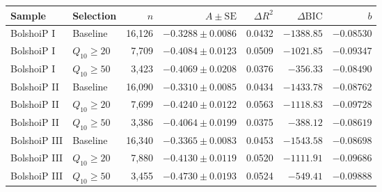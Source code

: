 \begin{tabular}{llrrrrr}
\toprule
Sample & Selection & $n$ & $A\pm\mathrm{SE}$ & $\Delta R^2$ & $\Delta\mathrm{BIC}$ & $b$ \\
\midrule
BolshoiP I & Baseline & 16,126 & $-0.3288\pm0.0086$ & 0.0432 & $-1388.85$ & $-0.08530$ \\
BolshoiP I & $Q_{10}\geq20$ & 7,709 & $-0.4084\pm0.0123$ & 0.0509 & $-1021.85$ & $-0.09347$ \\
BolshoiP I & $Q_{10}\geq50$ & 3,423 & $-0.4069\pm0.0208$ & 0.0376 & $-356.33$ & $-0.08490$ \\
BolshoiP II & Baseline & 16,090 & $-0.3310\pm0.0085$ & 0.0434 & $-1433.78$ & $-0.08762$ \\
BolshoiP II & $Q_{10}\geq20$ & 7,699 & $-0.4240\pm0.0122$ & 0.0563 & $-1118.83$ & $-0.09728$ \\
BolshoiP II & $Q_{10}\geq50$ & 3,386 & $-0.4064\pm0.0199$ & 0.0375 & $-388.12$ & $-0.08619$ \\
BolshoiP III & Baseline & 16,340 & $-0.3365\pm0.0083$ & 0.0453 & $-1543.58$ & $-0.08698$ \\
BolshoiP III & $Q_{10}\geq20$ & 7,880 & $-0.4130\pm0.0119$ & 0.0520 & $-1111.91$ & $-0.09686$ \\
BolshoiP III & $Q_{10}\geq50$ & 3,455 & $-0.4730\pm0.0193$ & 0.0524 & $-549.41$ & $-0.09888$ \\
\bottomrule
\end{tabular}
